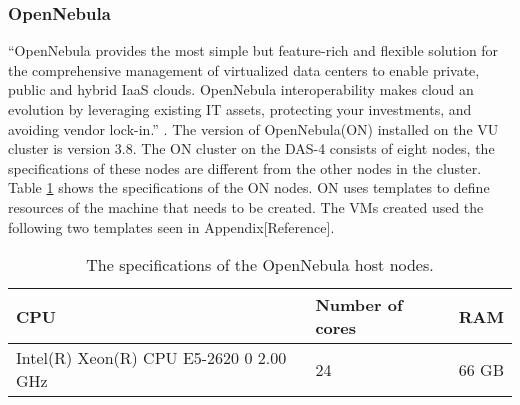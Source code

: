 \subsubsection{OpenNebula}
\label{hw:opennebula}
``OpenNebula  provides the most simple but feature-rich and flexible solution for the comprehensive management of virtualized data centers to enable private, public and hybrid IaaS clouds. OpenNebula interoperability makes cloud an evolution by leveraging existing IT assets, protecting your investments, and avoiding vendor lock-in.'' \cite{opennebula}. The version of OpenNebula(ON) installed on the VU cluster is version 3.8. The ON cluster on the DAS-4 consists of eight nodes, the specifications of these nodes are different from the other nodes in the cluster. Table \ref{tab:specs-opennebula} shows the specifications of the ON nodes. ON uses templates to define resources of the machine that needs to be created. The VMs created used the following two templates seen in Appendix[Reference].
\begin{table} [!h]
	\begin{center}
	\begin{tabular}{|l|l|l|}
		\hline
		CPU & Number of cores & RAM  \\ \hline
		Intel(R) Xeon(R) CPU E5-2620 0 2.00 GHz & 24 & 66 GB\\ \hline
	\end{tabular}
	\caption{The specifications of the OpenNebula host nodes.}
	\label{tab:specs-opennebula}
	\end{center}
\end{table}

